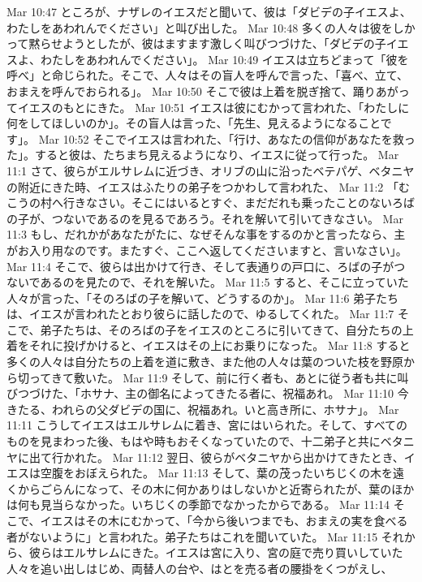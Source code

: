 Mar 10:47  ところが、ナザレのイエスだと聞いて、彼は「ダビデの子イエスよ、わたしをあわれんでください」と叫び出した。
Mar 10:48  多くの人々は彼をしかって黙らせようとしたが、彼はますます激しく叫びつづけた、「ダビデの子イエスよ、わたしをあわれんでください」。
Mar 10:49  イエスは立ちどまって「彼を呼べ」と命じられた。そこで、人々はその盲人を呼んで言った、「喜べ、立て、おまえを呼んでおられる」。
Mar 10:50  そこで彼は上着を脱ぎ捨て、踊りあがってイエスのもとにきた。
Mar 10:51  イエスは彼にむかって言われた、「わたしに何をしてほしいのか」。その盲人は言った、「先生、見えるようになることです」。
Mar 10:52  そこでイエスは言われた、「行け、あなたの信仰があなたを救った」。すると彼は、たちまち見えるようになり、イエスに従って行った。
Mar 11:1  さて、彼らがエルサレムに近づき、オリブの山に沿ったベテパゲ、ベタニヤの附近にきた時、イエスはふたりの弟子をつかわして言われた、
Mar 11:2  「むこうの村へ行きなさい。そこにはいるとすぐ、まだだれも乗ったことのないろばの子が、つないであるのを見るであろう。それを解いて引いてきなさい。
Mar 11:3  もし、だれかがあなたがたに、なぜそんな事をするのかと言ったなら、主がお入り用なのです。またすぐ、ここへ返してくださいますと、言いなさい」。
Mar 11:4  そこで、彼らは出かけて行き、そして表通りの戸口に、ろばの子がつないであるのを見たので、それを解いた。
Mar 11:5  すると、そこに立っていた人々が言った、「そのろばの子を解いて、どうするのか」。
Mar 11:6  弟子たちは、イエスが言われたとおり彼らに話したので、ゆるしてくれた。
Mar 11:7  そこで、弟子たちは、そのろばの子をイエスのところに引いてきて、自分たちの上着をそれに投げかけると、イエスはその上にお乗りになった。
Mar 11:8  すると多くの人々は自分たちの上着を道に敷き、また他の人々は葉のついた枝を野原から切ってきて敷いた。
Mar 11:9  そして、前に行く者も、あとに従う者も共に叫びつづけた、「ホサナ、主の御名によってきたる者に、祝福あれ。
Mar 11:10  今きたる、われらの父ダビデの国に、祝福あれ。いと高き所に、ホサナ」。
Mar 11:11  こうしてイエスはエルサレムに着き、宮にはいられた。そして、すべてのものを見まわった後、もはや時もおそくなっていたので、十二弟子と共にベタニヤに出て行かれた。
Mar 11:12  翌日、彼らがベタニヤから出かけてきたとき、イエスは空腹をおぼえられた。
Mar 11:13  そして、葉の茂ったいちじくの木を遠くからごらんになって、その木に何かありはしないかと近寄られたが、葉のほかは何も見当らなかった。いちじくの季節でなかったからである。
Mar 11:14  そこで、イエスはその木にむかって、「今から後いつまでも、おまえの実を食べる者がないように」と言われた。弟子たちはこれを聞いていた。
Mar 11:15  それから、彼らはエルサレムにきた。イエスは宮に入り、宮の庭で売り買いしていた人々を追い出しはじめ、両替人の台や、はとを売る者の腰掛をくつがえし、
